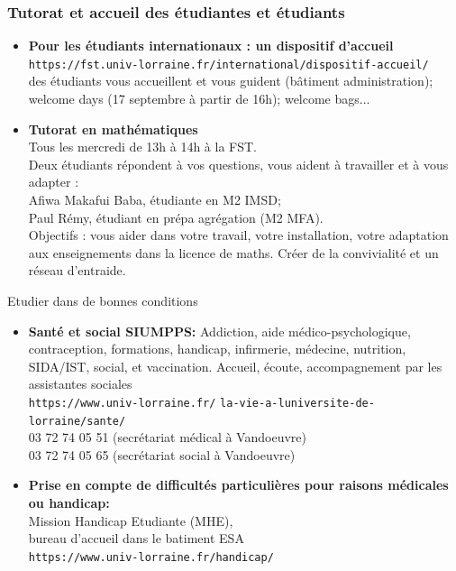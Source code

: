 \documentclass{beamer}
\begin{document}
\begin{frame}
\frametitle{Tutorat et accueil des étudiantes et étudiants}

\begin{itemize}
    
\item \textbf{Pour les étudiants internationaux : un dispositif d'accueil}\\
{\tt https://fst.univ-lorraine.fr/international/dispositif-accueil/}\\
des étudiants vous accueillent et vous guident (bâtiment administration);\\
welcome days (17 septembre à partir de 16h); welcome bags...

\item \textbf{Tutorat en mathématiques} \\
Tous les mercredi de 13h à 14h à la FST.\\
Deux étudiants répondent à vos questions, vous aident à travailler et à vous adapter :\\
Afiwa Makafui Baba, étudiante en M2 IMSD;\\
Paul Rémy, étudiant en prépa agrégation (M2 MFA). \\
Objectifs : vous aider dans votre travail, votre installation, votre adaptation aux enseignements dans la licence de maths. Créer de la convivialité et un réseau d'entraide.



\end{itemize}

\end{frame}



\begin{frame}{Etudier dans de bonnes conditions}

\begin{itemize}
    
\item \textbf{Santé et social SIUMPPS:} Addiction, aide médico-psychologique, contraception, formations, handicap, infirmerie, médecine, nutrition, SIDA/IST, social, et vaccination. Accueil, écoute, accompagnement par les assistantes sociales \\
{\tt https://www.univ-lorraine.fr/}
{\tt la-vie-a-luniversite-de-lorraine/sante/}\\
03 72 74 05 51 (secrétariat médical à Vandoeuvre)\\
03 72 74 05 65 (secrétariat social à Vandoeuvre)

\item \textbf{Prise en compte de difficultés particulières pour raisons médicales ou handicap:} \\
Mission Handicap Etudiante (MHE), \\
bureau d'accueil dans le batiment ESA \\
{\tt https://www.univ-lorraine.fr/handicap/}



\end{itemize}

\end{frame}
\end{document}
